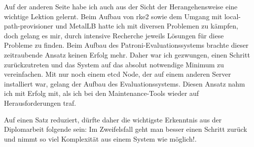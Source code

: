 \begin{flushleft}
    Auf der anderen Seite habe ich auch aus der Sicht der Herangehensweise eine wichtige Lektion gelernt.
    Beim Aufbau von \gls{rke2} sowie dem Umgang mit \gls{local-path-provisioner} und \Gls{MetalLB} hatte ich mit diversen Problemen zu kämpfen,
    doch gelang es mir, durch intensive Recherche jeweils Lösungen für diese Probleme zu finden.
    Beim Aufbau des Patroni-Evaluationssystems brachte dieser zeitraubende Ansatz keinen Erfolg mehr.
    Daher war ich gezwungen, einen Schritt zurückzutreten und das System auf das absolut notwendige Minimum zu vereinfachen.
    Mit nur noch einem \gls{etcd} Node, der auf einem anderen Server installiert war, gelang der Aufbau des Evaluationssystems.
    Diesen Ansatz nahm ich mit Erfolg mit, als ich bei den Maintenance-Tools wieder auf Herausforderungen traf.
\end{flushleft}
\begin{flushleft}
    Auf einen Satz reduziert, dürfte daher die wichtigste Erkenntnis aus der Diplomarbeit folgende sein:
    \guillemotleft Im Zweifelsfall geht man besser einen Schritt zurück und nimmt so viel Komplexität aus einem System wie möglich!\guillemotright.
\end{flushleft}